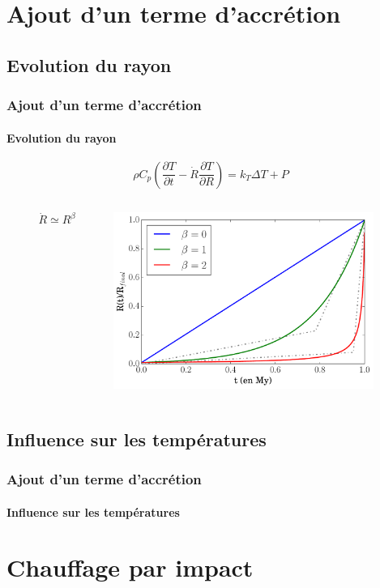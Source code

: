 \documentclass{beamer}
\begin{document}
\section{Ajout d'un terme d'accrétion}
\subsection{Evolution du rayon}

\begin{frame}
	\frametitle{Ajout d'un terme d'accrétion}
	\framesubtitle{Evolution du rayon}

		{\Large $$\rho C_p \left(\dfrac{\partial T}{\partial t} - \dot{R}\dfrac{\partial T}{\partial R}\right)  = k_{T} \Delta T  + P$$}
\begin{columns}
    \begin{column}{3cm}
      	{\huge $$\quad \dot{R} \simeq R^\beta$$}
	\end{column}

	\begin{column}{10cm}
\center \includegraphics[width = 8.5cm]{figures/rayon.pdf}
	\end{column}
\end{columns}
\end{frame}

\subsection{Influence sur les températures}
\begin{frame}
	\frametitle{Ajout d'un terme d'accrétion}
	\framesubtitle{Influence sur les températures}
	

	
\end{frame}

\section{Chauffage par impact}
\end{document}

